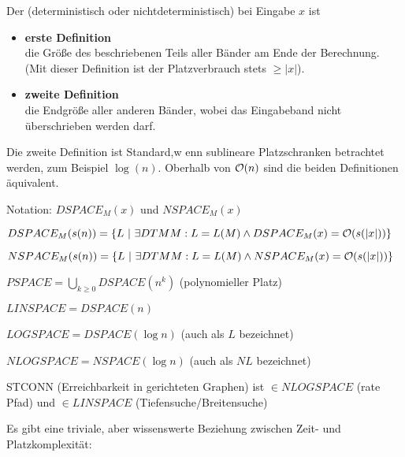 \begin{definition}

    Der  (deterministisch oder nichtdeterministisch) bei Eingabe $x$ ist 

    \begin{itemize}

        \item \textbf{erste Definition}\\ 
        die Größe des beschriebenen Teils aller Bänder am Ende der Berechnung. (Mit dieser Definition ist der Platzverbrauch stets $\geq |x|$).

        \item \textbf{zweite Definition}\\ 
        die Endgröße aller anderen Bänder, wobei das Eingabeband nicht überschrieben werden darf.

    \end{itemize}

    Die zweite Definition ist Standard,w enn sublineare Platzschranken betrachtet werden, zum Beispiel $\log(n)$. Oberhalb von $\mathcal{O}(n)$ sind die beiden Definitionen äquivalent.
    


    Notation: $DSPACE_M (x)$ und $NSPACE_M (x)$

    $DSPACE_M (s(n)) = \{   L  \ |\   \exists DTM M : L = L(M) \land DSPACE_M(x) = \mathcal{O}(s(|x|)) \}$

    $NSPACE_M (s(n)) = \{   L  \ |\   \exists DTM M : L = L(M) \land NSPACE_M(x) = \mathcal{O}(s(|x|)) \}$

    $PSPACE = \bigcup_{k \geq 0} DSPACE(n^k) $ (polynomieller Platz)

    $LINSPACE = DSPACE(n)$

    $LOGSPACE = DSPACE(\log n)$ (auch als $L$ bezeichnet)

    $NLOGSPACE = NSPACE(\log n)$ (auch als $NL$ bezeichnet)


\end{definition}


\begin{beispiel}
    
    STCONN (Erreichbarkeit in gerichteten Graphen) ist $\in NLOGSPACE$ (rate Pfad) und $\in LINSPACE$ (Tiefensuche/Breitensuche)

\end{beispiel}


Es gibt eine triviale, aber wissenswerte Beziehung zwischen Zeit- und Platzkomplexität:

